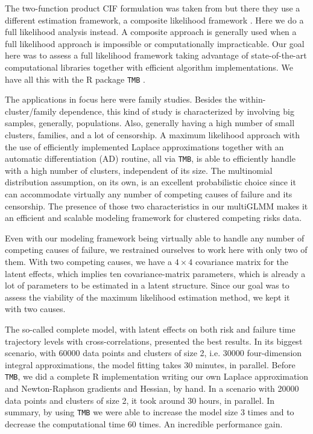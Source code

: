 \documentclass[a4paper,12pt]{article}
\begin{document}
The two-function product CIF formulation was taken from \cite{SCHEIKE}
but there they use a different estimation framework, a composite
likelihood framework \citep{lindsay88,cox&reid04,varin11}. Here we do a
full likelihood analysis instead. A composite approach is generally used
when a full likelihood approach is impossible or computationally
impracticable. Our goal here was to assess a full likelihood framework
taking advantage of state-of-the-art computational libraries together
with efficient algorithm implementations. We have all this with the R
\citep{R21} package \texttt{TMB} \citep{TMB}.

The applications in focus here were family studies. Besides the
within-cluster/family dependence, this kind of study is characterized by
involving big samples, generally, populations. Also, generally having a
high number of small clusters, families, and a lot of censorship. A
maximum likelihood approach with the use of efficiently implemented
Laplace approximations \citep{tierney,patrao} together with an automatic
differentiation (AD) \citep{corestats,nocedal&wright} routine, all via
\texttt{TMB}, is able to efficiently handle with a high number of
clusters, independent of its size. The multinomial distribution
assumption, on its own, is an excellent probabilistic choice since it
can accommodate virtually any number of competing causes of failure and
its censorship. The presence of those two characteristics in our
multiGLMM makes it an efficient and scalable modeling framework for
clustered competing risks data.

Even with our modeling framework being virtually able to handle any
number of competing causes of failure, we restrained ourselves to work
here with only two of them. With two competing causes, we have a
\(4\times4\) covariance matrix for the latent effects, which implies ten
covariance-matrix parameters, which is already a lot of parameters to be
estimated in a latent structure. Since our goal was to assess the
viability of the maximum likelihood estimation method, we kept it with
two causes.

The so-called complete model, with latent effects on both risk and
failure time trajectory levels with cross-correlations, presented the
best results. In its biggest scenario, with 60000 data points and
clusters of size 2, i.e. 30000 four-dimension integral approximations,
the model fitting takes 30 minutes, in parallel. Before \texttt{TMB}, we
did a complete R implementation writing our own Laplace approximation
\citep{patrao} and Newton-Raphson gradients and Hessian, by hand. In a
scenario with 20000 data points and clusters of size 2, it took around
30 hours, in parallel. In summary, by using \texttt{TMB} we were able to
increase the model size 3 times and to decrease the computational time
60 times. An incredible performance gain.
\end{document}
